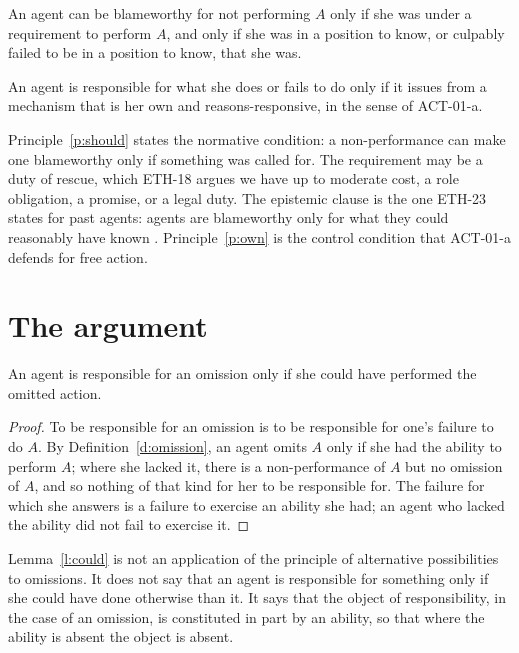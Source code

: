 \documentclass{situationist-preprint}
\begin{document}
\begin{principle}[Should]\label{p:should}
An agent can be blameworthy for not performing $A$ only if she was under a requirement to perform $A$, and only if she was in a position to know, or culpably failed to be in a position to know, that she was.
\end{principle}

\begin{principle}[Ownership]\label{p:own}
An agent is responsible for what she does or fails to do only if it issues from a mechanism that is her own and reasons-responsive, in the sense of ACT-01-a.
\end{principle}

Principle~\ref{p:should} states the normative condition: a non-performance can make one blameworthy only if something was called for. The requirement may be a duty of rescue, which ETH-18 argues we have up to moderate cost, a role obligation, a promise, or a legal duty. The epistemic clause is the one ETH-23 states for past agents: agents are blameworthy only for what they could reasonably have known \citep{Smith1983}. Principle~\ref{p:own} is the control condition that ACT-01-a defends for free action.

\section{The argument}

\begin{lemma}\label{l:could}
An agent is responsible for an omission only if she could have performed the omitted action.
\end{lemma}

\begin{proof}
To be responsible for an omission is to be responsible for one's failure to do $A$. By Definition~\ref{d:omission}, an agent omits $A$ only if she had the ability to perform $A$; where she lacked it, there is a non-performance of $A$ but no omission of $A$, and so nothing of that kind for her to be responsible for. The failure for which she answers is a failure to exercise an ability she had; an agent who lacked the ability did not fail to exercise it.
\end{proof}

Lemma~\ref{l:could} is not an application of the principle of alternative possibilities to omissions. It does not say that an agent is responsible for something only if she could have done otherwise than it. It says that the object of responsibility, in the case of an omission, is constituted in part by an ability, so that where the ability is absent the object is absent.
\end{document}
